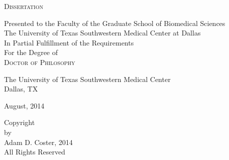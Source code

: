 \begin{titlepage}
\begin{center}
\vspace*{88pt}
\textsc{Dissertation}

\vspace*{22pt}
Presented to the Faculty of the Graduate School of Biomedical Sciences\\
The University of Texas Southwestern Medical Center at Dallas\\
In Partial Fulfillment of the Requirements\\
For the Degree of\\

\vspace*{44pt}
\textsc{Doctor of Philosophy}

\vspace*{44pt}
The University of Texas Southwestern Medical Center\\
Dallas, TX

\vspace*{22pt}
August, 2014

\end{center}



\newpage

\begin{center}
\vspace*{140pt}

Copyright \\

by \\

Adam D. Coster, 2014\\

All Rights Reserved\\

\end{center}

\end{titlepage}